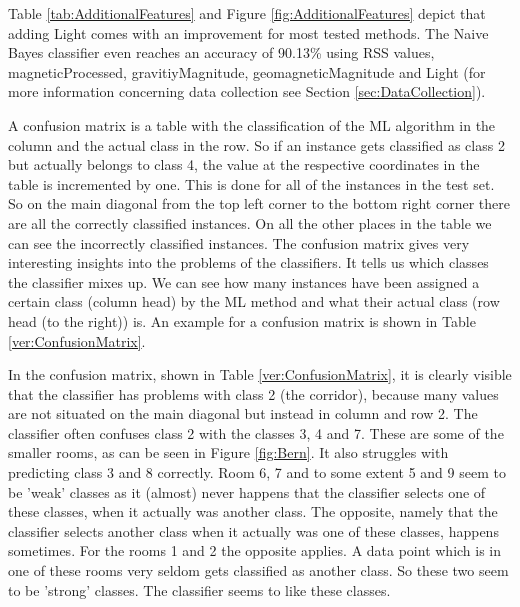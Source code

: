Table \ref{tab:AdditionalFeatures} and Figure \ref{fig:AdditionalFeatures} depict that adding Light comes with an improvement for most tested methods. The Naive Bayes classifier even reaches an accuracy of 90.13\% using RSS values, magneticProcessed, gravitiyMagnitude, geomagneticMagnitude and Light (for more information concerning data collection see Section  \ref{sec:DataCollection}).

A confusion matrix is a table with the classification of the ML algorithm in the column and the actual class in the row. So if an instance gets classified as class 2 but actually belongs to class 4, the value at the respective coordinates in the table is incremented by one. This is done for all of the instances in the test set. So on the main diagonal from the top left corner to the bottom right corner there are all the correctly classified instances. On all the other places in the table we can see the incorrectly classified instances. 
The confusion matrix gives very interesting insights into the problems of the classifiers. It tells us which classes the classifier mixes up. We can see how many instances have been assigned a certain class (column head) by the ML method and what their actual class (row head (to the right)) is. An example for a confusion matrix is shown in Table \ref{ver:ConfusionMatrix}.

In the confusion matrix, shown in Table \ref{ver:ConfusionMatrix}, it is clearly visible that the classifier has problems with class 2 (the corridor), because many values are not situated on the main diagonal but instead in column and row 2. The classifier often confuses class 2 with the classes 3, 4 and 7. These are some of the smaller rooms, as can be seen in Figure \ref{fig:Bern}. It also struggles with predicting class 3 and 8 correctly. 
Room 6, 7 and to some extent 5 and 9 seem to be 'weak' classes as it (almost) never happens that the classifier selects one of these classes, when it actually was another class. The opposite, namely that the classifier selects another class when it actually was one of these classes, happens sometimes.
For the rooms 1 and 2 the opposite applies. A data point which is in one of these rooms very seldom gets classified as another class. So these two seem to be 'strong' classes. The classifier seems to like these classes.




